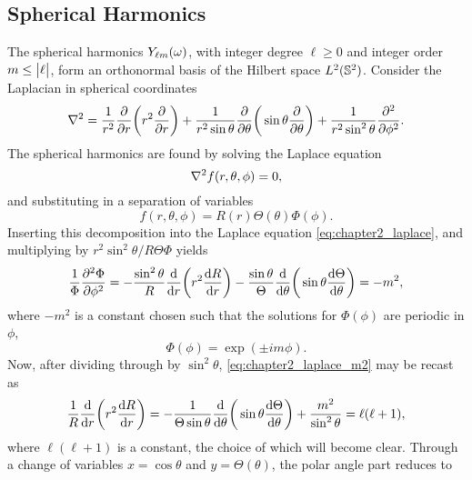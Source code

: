 \subsection{Spherical Harmonics}\label{sec:chapter2_spherical_harmonics}

The spherical harmonics \({Y}_{\ell m}(\omega)\), with integer degree \(\ell \geq 0\) and integer order \(m \leq \big\lvert\ell\big\rvert\), form an orthonormal basis of the Hilbert space \(L^{2}(\mathbb{S}^{2})\).
Consider the Laplacian in spherical coordinates
%
\begin{equation}
	\laplacian
	= \frac{1}{r^{2}} \pdv{r} \bigg(r^{2} \pdv{r}\bigg)
	+ \frac{1}{r^{2}\sin{\theta}} \pdv{\theta} \bigg(\sin{\theta} \pdv{\theta}\bigg)
	+ \frac{1}{r^{2}\sin^{2}{\theta}} \pdv[2]{\phi}.
\end{equation}
%
The spherical harmonics are found by solving the Laplace equation
%
\begin{equation}\label{eq:chapter2_laplace}
	\laplacian{f(r,\theta,\phi)}
	= 0,
\end{equation}
%
and substituting in a separation of variables
%
\begin{equation}
	f(r,\theta,\phi)
	= R(r)\Theta(\theta)\Phi(\phi).
\end{equation}
%
Inserting this decomposition into the Laplace equation \cref{eq:chapter2_laplace}, and multiplying by \(r^{2}\sin^{2}{\theta}/R\Theta\Phi{}\) yields
%
\begin{equation}\label{eq:chapter2_laplace_m2}
	\frac{1}{\Phi} \pdv[2]{\Phi}{\phi}
	= -\frac{\sin^{2}{\theta}}{R} \dv{r} \bigg(r^{2} \dv{R}{r}\bigg)
	- \frac{\sin{\theta}}{\Theta} \dv{\theta} \bigg(\sin{\theta} \dv{\Theta}{\theta}\bigg)
	= -m^{2},
\end{equation}
%
where \(-m^{2}\) is a constant chosen such that the solutions for \(\Phi(\phi)\) are periodic in \(\phi{}\), \ie{}
%
\begin{equation}
	\Phi(\phi)
	= \exp(\pm i m\phi).
\end{equation}
%
Now, after dividing through by \(\sin^{2}{\theta}\), \cref{eq:chapter2_laplace_m2} may be recast as
%
\begin{equation}
	\frac{1}{R} \dv{r} \bigg(r^{2} \dv{R}{r}\bigg)
	= -\frac{1}{\Theta\sin{\theta}} \dv{\theta} \bigg(\sin{\theta} \dv{\Theta}{\theta}\bigg)
	+ \frac{m^{2}}{\sin^{2}{\theta}}
	= \ell(\ell+1),
\end{equation}
%
where \(\ell(\ell+1)\) is a constant, the choice of which will become clear.
Through a change of variables \(x=\cos{\theta}\) and \(y=\Theta(\theta)\), the polar angle part reduces to
